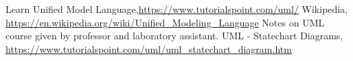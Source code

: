 \begin{thebibliography}{99999}
\singlespace\normalsize

 Learn Unified Model Language,\url{https://www.tutorialspoint.com/uml/}
 Wikipedia, \url{https://en.wikipedia.org/wiki/Unified_Modeling_Language}
 Notes on UML course given by professor and laboratory assistant.
 UML - Statechart Diagrams, \url{https://www.tutorialspoint.com/uml/uml_statechart_diagram.htm}




\end{thebibliography}
